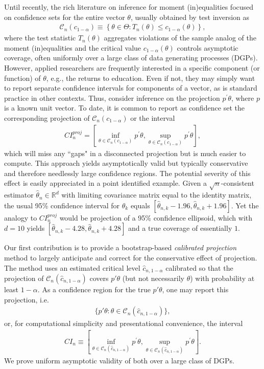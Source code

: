 \documentclass[letterpaper,11pt]{article}
\theoremstyle{myplain}
\theoremstyle{mydefinition}
\theoremstyle{myremark}
\newcommand{\R}{\mathbb{R}}
\newcommand{\cC}{\mathcal{C}}
\numberwithin{equation}{section}
\numberwithin{figure}{section}
\begin{document}
Until recently, the rich literature on inference for moment (in)equalities focused on confidence sets for the entire vector $\theta$, usually obtained by test inversion as
\begin{align}
	\mathcal C_n(c_{1-\alpha})\equiv \left\{\theta\in\Theta:T_n(\theta )\leq c_{1-\alpha}(\theta )\right\},\label{eq:cs}
\end{align}
where the test statistic $T_n(\theta)$ aggregates violations of the sample analog of the moment (in)equalities and the critical value $c_{1-\alpha}(\theta)$ controls asymptotic coverage, often uniformly over a large class of data generating processes (DGPs). 
However, applied researchers are frequently interested in a specific component (or function) of $\theta$, e.g., the returns to education. Even if not, they may simply want to report separate confidence intervals for components of a vector, as is standard practice in other contexts. Thus, consider inference on the projection $p^{\prime }\theta$, where $p$ is a known unit vector.
To date, it is common to report as confidence set the corresponding projection of $\mathcal C_n(c_{1-\alpha})$ or the interval
\begin{align}
	CI^{proj}_n=\left[\inf_{\theta\in\mathcal C_n(c_{1-\alpha})} p^{\prime}\theta, \sup_{\theta\in\mathcal C_n(c_{1-\alpha})} p^{\prime }\theta \right],\label{eq:def_ci_AS}
\end{align}
which will miss any ``gaps" in a disconnected projection but is much easier to compute. This approach yields asymptotically valid but typically conservative and therefore needlessly large confidence regions. The potential severity of this effect is easily appreciated in a point identified example. Given a $\sqrt{n}$-consistent estimator $\hat{\theta}_n \in \R^d$ with limiting covariance matrix equal to the identity matrix, the usual 95\% confidence interval for $\theta_k$ equals $[\hat{\theta}_{n,k}-1.96,\hat{\theta}_{n,k}+1.96]$. Yet the analogy to $CI^{proj}_n$ would be projection of a 95\% confidence ellipsoid, which with $d=10$ yields $[\hat{\theta}_{n,k}-4.28,\hat{\theta}_{n,k}+4.28]$ and a true coverage of essentially $1$.

Our first contribution is to provide a bootstrap-based \emph{calibrated projection} method to largely anticipate and correct for the conservative effect of projection. The method uses an estimated critical level $\hat{c}_{n,1-\alpha}$ calibrated so that the projection of $\mathcal C_n(\hat{c}_{n,1-\alpha})$ covers $p'\theta$ (but not necessarily $\theta$) with probability at least $1-\alpha$. As a confidence region for the true $p'\theta$, one may report this projection, i.e.
\begin{align}
\{p'\theta:\theta \in \cC_n(\hat{c}_{n,1-\alpha})\}, \label{eq:def_with_gaps}
\end{align}
or, for computational simplicity and presentational convenience, the interval
\begin{align}
	CI_n \equiv \left[\inf_{\theta\in\mathcal C_n(\hat{c}_{n,1-\alpha})} p^{\prime}\theta, \sup_{\theta\in\mathcal C_n(\hat{c}_{n,1-\alpha})} p^{\prime }\theta \right].\label{eq:def_ci}
\end{align}
We prove uniform asymptotic validity of both over a large class of DGPs.
\end{document}

